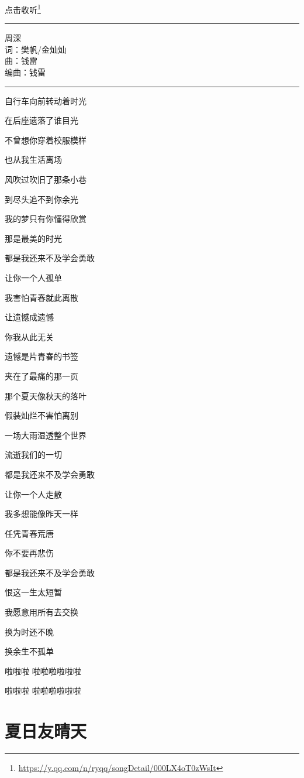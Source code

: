\documentclass[]{ctexbook}
\renewcommand{\href}[2]{#2\footnote{\url{#1}}}
\begin{document}
\href{https://y.qq.com/n/ryqq/songDetail/000LX4oT0zWsIt}{点击收听}

\begin{center}\rule{0.5\linewidth}{0.5pt}\end{center}

周深\\
词：樊帆/金灿灿\\
曲：钱雷\\
编曲：钱雷

\begin{center}\rule{0.5\linewidth}{0.5pt}\end{center}

自行车向前转动着时光

在后座遗落了谁目光

不曾想你穿着校服模样

也从我生活离场

风吹过吹旧了那条小巷

到尽头追不到你余光

我的梦只有你懂得欣赏

那是最美的时光

都是我还来不及学会勇敢

让你一个人孤单

我害怕青春就此离散

让遗憾成遗憾

你我从此无关

遗憾是片青春的书签

夹在了最痛的那一页

那个夏天像秋天的落叶

假装灿烂不害怕离别

一场大雨湿透整个世界

流逝我们的一切

都是我还来不及学会勇敢

让你一个人走散

我多想能像昨天一样

任凭青春荒唐

你不要再悲伤

都是我还来不及学会勇敢

恨这一生太短暂

我愿意用所有去交换

换为时还不晚

换余生不孤单

啦啦啦 啦啦啦啦啦啦

啦啦啦 啦啦啦啦啦啦

\section*{夏日友晴天}\label{sunny-day-in-summer}
\end{document}
